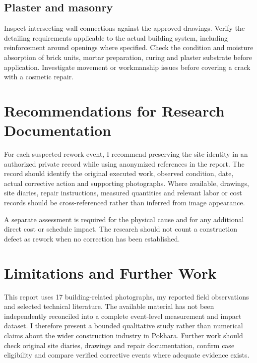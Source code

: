 \subsection{Plaster and masonry}
Inspect intersecting-wall connections against the approved drawings. Verify the detailing requirements applicable to the actual building system, including reinforcement around openings where specified. Check the condition and moisture absorption of brick units, mortar preparation, curing and plaster substrate before application. Investigate movement or workmanship issues before covering a crack with a cosmetic repair.

\section{Recommendations for Research Documentation}
For each suspected rework event, I recommend preserving the site identity in an authorized private record while using anonymized references in the report. The record should identify the original executed work, observed condition, date, actual corrective action and supporting photographs. Where available, drawings, site diaries, repair instructions, measured quantities and relevant labor or cost records should be cross-referenced rather than inferred from image appearance.

A separate assessment is required for the physical cause and for any additional direct cost or schedule impact. The research should not count a construction defect as rework when no correction has been established.

\section{Limitations and Further Work}
This report uses 17 building-related photographs, my reported field observations and selected technical literature. The available material has not been independently reconciled into a complete event-level measurement and impact dataset. I therefore present a bounded qualitative study rather than numerical claims about the wider construction industry in Pokhara. Further work should check original site diaries, drawings and repair documentation, confirm case eligibility and compare verified corrective events where adequate evidence exists.
